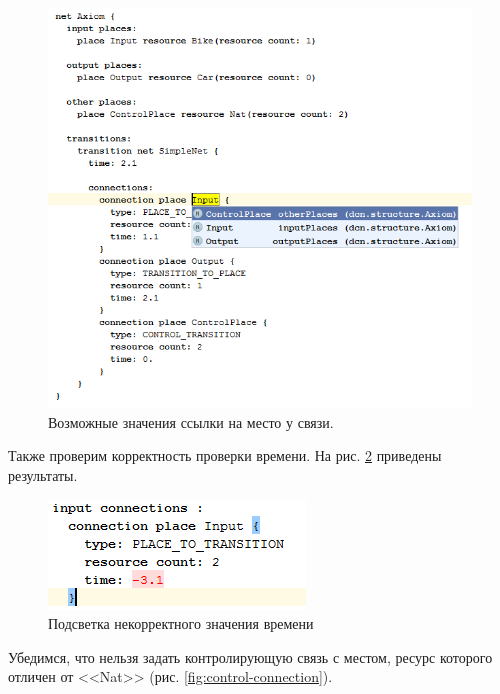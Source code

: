			\begin{figure}[th]
				\centering
				\includegraphics[width=0.7\linewidth]{images/test-project/connection}
				\caption{Возможные значения ссылки на место у связи.}
				\label{fig:connection-test}
			\end{figure}
			\FloatBarrier
			
			Также проверим корректность проверки времени. На рис. \ref{fig:time} приведены результаты.
	
			\begin{figure}[th]
				\centering
				\includegraphics[width=0.4\linewidth]{images/test-project/time}
				\caption{Подсветка некорректного значения времени}
				\label{fig:time}
			\end{figure}
			\FloatBarrier
			\clearpage
		
			Убедимся, что нельзя задать контролирующую связь с местом, ресурс которого отличен от <<Nat>> (рис. \ref{fig:control-connection}).
			
